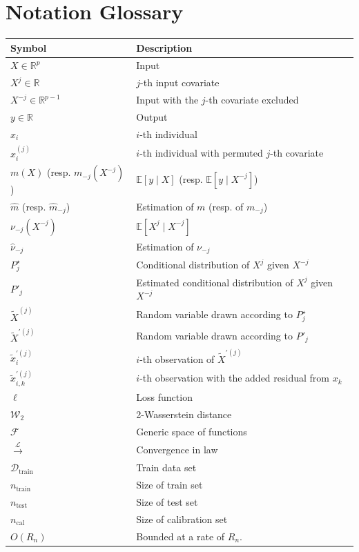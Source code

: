 \documentclass{article}
\theoremstyle{plain}
\theoremstyle{definition}
\theoremstyle{remark}
\newcommand{\e}[1]{\mathbb{E}\left[#1\right]  } %
\begin{document}
\section{Notation Glossary}\label{app:glossary}

\begin{longtable}{p{4cm} p{12cm}}
\textbf{Symbol} & \textbf{Description} \\
\hline
$X\in \mathbb{R}^p$ & Input\\
$X^j\in \mathbb{R}$ & $j$-th input covariate\\
$X^{-j}\in \mathbb{R}^{p-1}$ & Input with the $j$-th covariate excluded\\
$y\in \mathbb{R}$ & Output\\
$x_i$ & $i$-th individual\\
$x_i^{(j)}$ & $i$-th individual with permuted $j$-th covariate\\
$m(X)$ (resp. $m_{-j}(X^{-j})$) & $\e{y\mid X}$ (resp. $\e{y\mid X^{-j}}$)\\
$\widehat{m}$ (resp. $\widehat{m}_{-j}$) & Estimation of $m$ (resp. of $m_{-j}$) \\
$\nu_{-j}(X^{-j})$ & $\e{X^j\mid X^{-j}}$\\
$\widehat{\nu}_{-j}$ & Estimation of $\nu_{-j}$\\
$P^\star_j$ & Conditional distribution of $X^j$ given $X^{-j}$\\
$P'_j$ & Estimated conditional distribution of $X^j$ given $X^{-j}$\\
$\widetilde{X}^{(j)}$ & Random variable drawn according to $P^\star_j$\\
$\widetilde{X}^{'(j)}$ & Random variable drawn according to $P'_j$\\
$\widetilde{x}^{'(j)}_i$ & $i$-th observation of $\widetilde{X}^{'(j)}$\\
$\widetilde{x}^{'(j)}_{i,k}$ & $i$-th observation with the added residual from $x_k$\\
$\ell$ & Loss function\\
$\mathcal{W}_2$ & 2-Wasserstein distance\\
$\mathcal{F}$ & Generic space of functions\\
$\overset{\mathcal{L}}{\to}$ & Convergence in law\\
$\mathcal{D}_\mathrm{train}$ & Train data set\\
$n_\mathrm{train}$ & Size of train set\\
$n_\mathrm{test}$ & Size of test set\\
$n_\mathrm{cal}$ & Size of calibration set\\
$O(R_n)$ & Bounded at a rate of $R_n$. 
\end{longtable}
\end{document}
